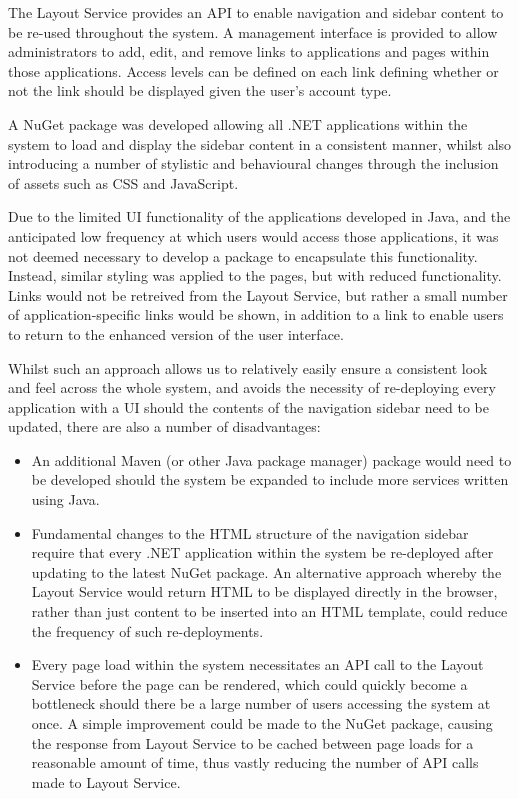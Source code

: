 The Layout Service provides an API to enable navigation and sidebar content to be re-used throughout the system.  A management interface is provided to allow administrators to add, edit, and remove links to applications and pages within those applications.  Access levels can be defined on each link defining whether or not the link should be displayed given the user's account type.

A NuGet package was developed allowing all .NET applications within the system to load and display the sidebar content in a consistent manner, whilst also introducing a number of stylistic and behavioural changes through the inclusion of assets such as CSS and JavaScript.

Due to the limited UI functionality of the applications developed in Java, and the anticipated low frequency at which users would access those applications, it was not deemed necessary to develop a package to encapsulate this functionality.  Instead, similar styling was applied to the pages, but with reduced functionality.  Links would not be retreived from the Layout Service, but rather a small number of application-specific links would be shown, in addition to a link to enable users to return to the enhanced version of the user interface.

Whilst such an approach allows us to relatively easily ensure a consistent look and feel across the whole system, and avoids the necessity of re-deploying every application with a UI should the contents of the navigation sidebar need to be updated, there are also a number of disadvantages:
\begin{itemize}
    \item An additional Maven (or other Java package manager) package would need to be developed should the system be expanded to include more services written using Java.
    \item Fundamental changes to the HTML structure of the navigation sidebar require that every .NET application within the system be re-deployed after updating to the latest NuGet package.  An alternative approach whereby the Layout Service would return HTML to be displayed directly in the browser, rather than just content to be inserted into an HTML template, could reduce the frequency of such re-deployments.
    \item Every page load within the system necessitates an API call to the Layout Service before the page can be rendered, which could quickly become a bottleneck should there be a large number of users accessing the system at once.  A simple improvement could be made to the NuGet package, causing the response from Layout Service to be cached between page loads for a reasonable amount of time, thus vastly reducing the number of API calls made to Layout Service.
\end{itemize}

